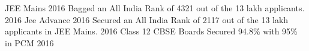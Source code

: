\begin{cvhonors}
  \cvhonor
    {JEE Mains 2016}
    {Bagged an All India Rank of 4321 out of the 13 lakh applicants.}
    {}
    {2016}
  \cvhonor
    {Jee Advance 2016}
    {Secured an All India Rank of 2117 out of the 13 lakh applicants in JEE Mains.}
    {}
    {2016}
  \cvhonor
    {Class 12 CBSE Boards}
    {Secured 94.8\% with 95\% in PCM}
    {}
    {2016}
\end{cvhonors}
